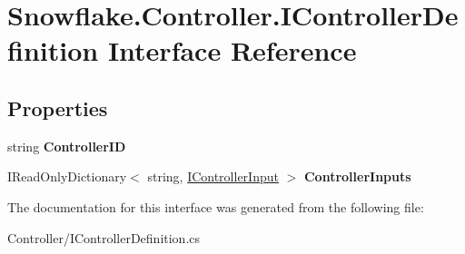 \hypertarget{interface_snowflake_1_1_controller_1_1_i_controller_definition}{}\section{Snowflake.\+Controller.\+I\+Controller\+Definition Interface Reference}
\label{interface_snowflake_1_1_controller_1_1_i_controller_definition}
\subsection*{Properties}
\begin{DoxyCompactItemize}
\item 
\hypertarget{interface_snowflake_1_1_controller_1_1_i_controller_definition_a91b1721244d428e39c1833bd82a7c420}{}string {\bfseries Controller\+I\+D}\label{interface_snowflake_1_1_controller_1_1_i_controller_definition_a91b1721244d428e39c1833bd82a7c420}

\item 
\hypertarget{interface_snowflake_1_1_controller_1_1_i_controller_definition_a3d0737e0a8d939836e8c453c8f6625aa}{}I\+Read\+Only\+Dictionary$<$ string, \hyperlink{interface_snowflake_1_1_controller_1_1_i_controller_input}{I\+Controller\+Input} $>$ {\bfseries Controller\+Inputs}\label{interface_snowflake_1_1_controller_1_1_i_controller_definition_a3d0737e0a8d939836e8c453c8f6625aa}

\end{DoxyCompactItemize}


The documentation for this interface was generated from the following file\+:\begin{DoxyCompactItemize}
\item 
Controller/I\+Controller\+Definition.\+cs\end{DoxyCompactItemize}
